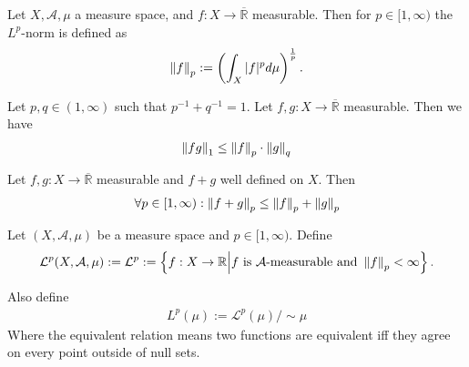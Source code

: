 \begin{definition}[\(L^p\)-Norm]
    Let \(X, \mathcal{A}, \mu\) a measure space, and \(f: X \rightarrow \overline{\mathbb{R}}\) measurable. Then for \(p \in [1, \infty)\) the \(L^p\)-norm is defined as
    \begin{align}
        \left\lVert f\right\rVert_p := \left( \int_X |f|^p d\mu \right)^{\frac{1}{p}} \text{.}
    \end{align}
\end{definition}

\begin{theorem}
    Let \(p, q \in (1, \infty)\) such that \(p^{-1} + q^{-1} =1\). Let \(f, g: X \rightarrow \overline{\mathbb{R}}\) measurable. Then we have
    \begin{align}
        \left\lVert fg\right\rVert_1 \leq \left\lVert f\right\rVert_p \cdot \left\lVert g\right\rVert_q
    \end{align}
\end{theorem}

\begin{theorem}
    Let \(f, g: X \rightarrow \overline{\mathbb{R}}\) measurable and \(f + g\) well defined on \(X\). Then
    \begin{align}
        \forall p \in [1, \infty) : \left\lVert f + g\right\rVert_p \leq \left\lVert f\right\rVert_p + \left\lVert g\right\rVert_p
    \end{align}
\end{theorem}

\begin{definition}
    Let \( (X, \mathcal{A}, \mu) \) be a measure space and \(p \in [1, \infty)\). Define
    \begin{align}
        \mathcal{L}^p(X, \mathcal{A}, \mu) := \mathcal{L}^p := \left\{f: X \rightarrow \mathbb{R} \middle| f \text{ is \(\mathcal{A}\)-measurable and } \left\lVert f\right\rVert_p < \infty \right\} \text{.}
    \end{align}
\end{definition}
Also define
\begin{align}
    L^p(\mu) := \mathcal{L}^p(\mu) / \mathtt{\sim} \mu
\end{align}
Where the equivalent relation means two functions are equivalent iff they agree on every point outside of null sets.